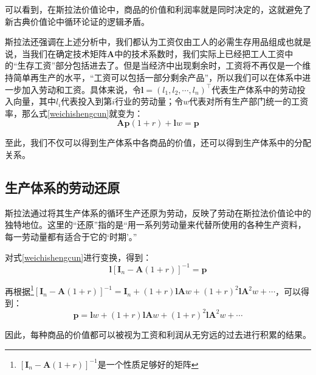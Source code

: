 可以看到，在斯拉法价值论中，商品的价值和利润率就是同时决定的，这就避免了新古典价值论中循环论证的逻辑矛盾。

斯拉法还强调在上述分析中，我们都认为工资仅由工人的必需生存用品组成\cite[11]{SiLaFaYongShangPinShengChanShangPinJingJiLiLunPiPanXuLun1963}也就是说，当我们在确定技术矩阵$\bm{A}$中的技术系数时，我们实际上已经把工人工资中的“生存工资”部分包括进去了。但是当经济中出现剩余时，工资将不再仅是一个维持简单再生产的水平，“工资可以包括一部分剩余产品”\cite[11]{SiLaFaYongShangPinShengChanShangPinJingJiLiLunPiPanXuLun1963}，所以我们可以在体系中进一步加入劳动和工资。具体来说，令$\bm{l} = \left( l_1, l_2, \cdots, l_n \right)^\top$代表生产体系中的劳动投入向量，其中$l_i$代表投入到第$i$行业的劳动量；令$w$代表对所有生产部门统一的工资率，那么式\ref{weichishengcun}就变为：
\begin{equation}
    \bm{A} \bm{p} \left( 1 + r \right) + \bm{l} w = \bm{p}
\end{equation}

至此，我们不仅可以得到生产体系中各商品的价值，还可以得到生产体系中的分配关系。

\subsection{生产体系的劳动还原}

斯拉法通过将其生产体系的循环生产还原为劳动，反映了劳动在斯拉法价值论中的独特地位。这里的“还原”指的是“用一系列劳动量来代替所使用的各种生产资料，每一劳动量都有适合于它的‘时期’。”\cite[37]{SiLaFaYongShangPinShengChanShangPinJingJiLiLunPiPanXuLun1963}

对式\ref{weichishengcun}进行变换，得到：
\begin{equation}
    \bm{l}\left[ \bm{I}_n - \bm{A} \left( 1+r \right) \right]^{-1} = \bm{p}
\end{equation}

再根据\footnote{$\left[ \bm{I}_n - \bm{A} \left( 1+r \right) \right]^{-1}$是一个性质足够好的矩阵\cite[89]{pasinettiLecturesTheoryProduction1977}}$\left[ \bm{I}_n - \bm{A} \left( 1+r \right) \right]^{-1} = \bm{I}_n + \left( 1+r \right) \bm{l} \bm{A} w + \left( 1+r \right)^2 \bm{l} \bm{A}^2 w + \cdots $，可以得到：
\begin{equation}
    \bm{p} = \bm{l}w + \left( 1+r \right)\bm{l}\bm{A}w + \left( 1+r \right)^2 \bm{l}\bm{A}^2w + \cdots
\end{equation}

因此，每种商品的价值都可以被视为工资和利润从无穷远的过去进行积累的结果\cite[37-38]{SiLaFaYongShangPinShengChanShangPinJingJiLiLunPiPanXuLun1963}\cite[193]{CaiJiMingCongGuDianZhengZhiJingJiXueDaoZhongGuoTeSeSheHuiZhuYiZhengZhiJingJiXueJiYuZhongGuoShiJiaoDeZhengZhiJingJiXueYanBianShangCe2023}。

